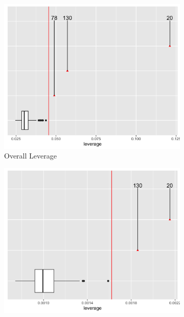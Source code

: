 \documentclass[12pt,twoside,letterpaper]{article}
\theoremstyle{definition}
\theoremstyle{definition}
\begin{document}
    \begin{figure}[H] 
        \centering
        \begin{subfigure}[b]{0.38\textwidth}
        \centering
        \includegraphics[width=\textwidth]{pics/lev overall.png}
        \caption[]%
        {{\small Overall Leverage}}
        \label{fig: lev overall}
        \end{subfigure}
        \hfill
        \begin{subfigure}[b]{0.38\textwidth}
        \centering
        \includegraphics[width=\textwidth]{pics/lev fixed.png}

\end{subfigure}
\end{figure}
\end{document}
